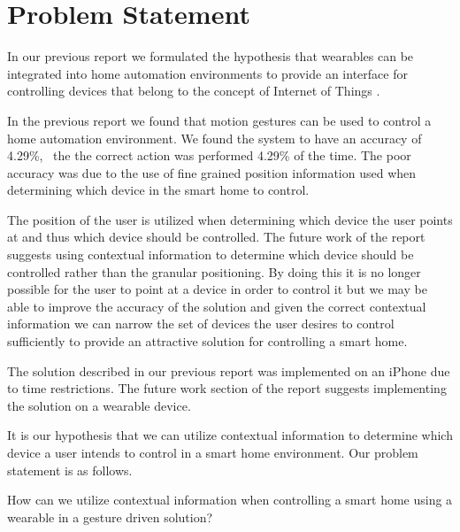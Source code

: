 \section{Problem Statement}
\label{sec:problem-statement}

In our previous report we formulated the hypothesis that wearables can be integrated into home automation environments to provide an interface for controlling devices that belong to the concept of Internet of Things \cite[pp. 14]{prespecialisation}.

In the previous report \cite[pp. 69-73]{prespecialisation} we found that motion gestures can be used to control a home automation environment. We found the system to have an accuracy of 4.29\%, \ie~the the correct action was performed 4.29\% of the time. The poor accuracy was due to the use of fine grained position information used when determining which device in the smart home to control.

The position of the user is utilized when determining which device the user points at and thus which device should be controlled. The future work of the report \cite[pp. 71-73]{prespecialisation} suggests using contextual information to determine which device should be controlled rather than the granular positioning. By doing this it is no longer possible for the user to point at a device in order to control it but we may be able to improve the accuracy of the solution and given the correct contextual information we can narrow the set of devices the user desires to control sufficiently to provide an attractive solution for controlling a smart home.

The solution described in our previous report was implemented on an iPhone due to time restrictions. The future work section of the report suggests implementing the solution on a wearable device.

It is our hypothesis that we can utilize contextual information to determine which device a user intends to control in a smart home environment. Our problem statement is as follows.

\begin{framed}
  How can we utilize contextual information when controlling a smart home using a wearable in a gesture driven solution?
\end{framed}

